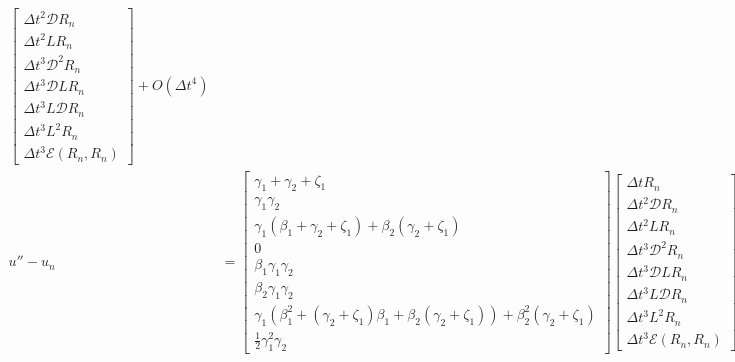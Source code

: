 \documentclass[letterpaper,11pt]{amsart}
\newcommand{\order}[2]{\ensuremath{O\!\left( {#1}^{#2} \right)}}
\begin{document}
\begin{align}
\begin{bmatrix}
  \Delta{}t^{2} \mathcal{D} R_{n} \\
  \Delta{}t^{2} L R_{n} \\
  \Delta{}t^{3} \mathcal{D}^{2} R_{n} \\
  \Delta{}t^{3} \mathcal{D} L R_{n} \\
  \Delta{}t^{3} L \mathcal{D} R_{n} \\
  \Delta{}t^{3} L^{2} R_{n} \\
  \Delta{}t^{3} \mathcal{E}\left( R_{n}, R_{n} \right)
\end{bmatrix}
  + \order{\Delta{}t}{4}
\\
  u'' - u_{n}
  &=
\begin{bmatrix}
  \gamma_{1} + \gamma_{2} + \zeta_{1} \\
  \gamma_{1} \gamma_{2} \\
    \gamma_{1} \left(\beta_{1} + \gamma_{2} + \zeta_{1}\right)
  + \beta_{2} \left(\gamma_{2} + \zeta_{1}\right) \\
  0 \\
  \beta_{1} \gamma_{1} \gamma_{2} \\
  \beta_{2} \gamma_{1} \gamma_{2} \\
    \gamma_{1} \left(
        \beta_{1}^2 + \left(\gamma_{2} + \zeta_{1}\right) \beta_{1}
      + \beta_{2} \left(\gamma_{2} + \zeta_{1}\right)
    \right)
    + \beta_{2}^2 \left(\gamma_{2} + \zeta_{1}\right)
  \\
  \frac{1}{2} \gamma_{1}^{2} \gamma_{2}
\end{bmatrix}
\begin{bmatrix}
  \Delta{}t R_{n} \\
  \Delta{}t^{2} \mathcal{D} R_{n} \\
  \Delta{}t^{2} L R_{n} \\
  \Delta{}t^{3} \mathcal{D}^{2} R_{n} \\
  \Delta{}t^{3} \mathcal{D} L R_{n} \\
  \Delta{}t^{3} L \mathcal{D} R_{n} \\
  \Delta{}t^{3} L^{2} R_{n} \\
  \Delta{}t^{3} \mathcal{E}\left( R_{n}, R_{n} \right)
\end{bmatrix}
  + \order{\Delta{}t}{4}
\end{align}
\end{document}
